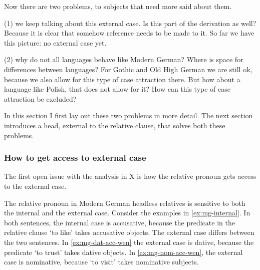 Now there are two problems, to subjects that need more said about them.

(1) we keep talking about this external case. Is this part of the derivation as well? Because it is clear that somehow reference needs to be made to it. So far we have this picture: no external case yet. %

(2) why do not all languages behave like Modern German? Where is space for differences between languages? For Gothic and Old High German we are still ok, because we also allow for this type of case attraction there. But how about a language like Polish, that does not allow for it? How can this type of case attraction be excluded?


In this section I first lay out these two problems in more detail. The next section introduces a head, external to the relative clause, that solves both these problems.


\subsubsection{How to get access to external case}

The first open issue with the analysis in X is how the relative pronoun gets access to the external case.

The relative pronoun in Modern German headless relatives is sensitive to both the internal and the external case. Consider the examples in \ref{ex:mg-internal}. In both sentences, the internal case is accusative, because the predicate in the relative clause  `to like' takes accusative objects. The external case differs between the two sentences. In \ref{ex:mg-dat-acc-wen} the external case is dative, because the predicate  `to trust' takes dative objects.  In \ref{ex:mg-nom-acc-wen}, the external case is nominative, because  `to visit' takes nominative subjects.

